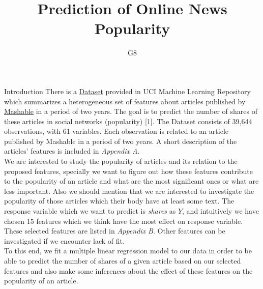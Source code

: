 \documentclass[a4paper,11pt]{article}
\begin{document}

\title{Prediction of Online News Popularity}
\author{G8}

\maketitle

\begin{section} 
{Introduction}
There is a \href{http://archive.ics.uci.edu/ml/datasets/Online+News+Popularity}{Dataset} provided in UCI Machine Learning Repository which summarizes a heterogeneous set of features about articles published by \href{http://mashable.com}{Mashable} in a period of two years. The goal is to predict the number of shares of these articles in social networks (popularity) [1]. The Dataset consists of 39,644 observations, with 61 variables. Each observation is related to an article published by Mashable in a period of two years. A short description of the articles' features is included in \textit{Appendix A}.\\
We are interested to study the popularity of articles and its relation to the proposed features, specially we want to figure out how these features contribute to the popularity of an article and what are the most significant ones or what are less important. Also we should mention that we are interested to investigate the popularity of those articles which their body have at least some text. The response variable which we want to predict is \textit{shares} as $Y$, and intuitively we have chosen 15 features which we think have the most effect on response variable. These selected features are listed in \textit{Appendix B}. Other features can be investigated if we encounter lack of fit.\\
To this end, we fit a multiple linear regression model to our data in order to be able to predict the number of shares of a given article based on our selected features and also make some inferences about the effect of these features on the popularity of an article.
\end{section}
\end{document}
